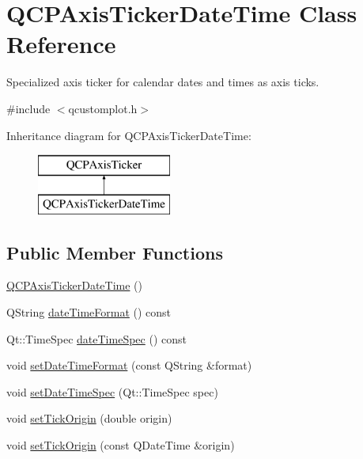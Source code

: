 \hypertarget{class_q_c_p_axis_ticker_date_time}{}\section{Q\+C\+P\+Axis\+Ticker\+Date\+Time Class Reference}
\label{class_q_c_p_axis_ticker_date_time}


Specialized axis ticker for calendar dates and times as axis ticks.  




{\ttfamily \#include $<$qcustomplot.\+h$>$}

Inheritance diagram for Q\+C\+P\+Axis\+Ticker\+Date\+Time\+:\begin{figure}[H]
\begin{center}
\leavevmode
\includegraphics[height=2.000000cm]{d0/da7/class_q_c_p_axis_ticker_date_time}
\end{center}
\end{figure}
\subsection*{Public Member Functions}
\begin{DoxyCompactItemize}
\item 
\mbox{\hyperlink{class_q_c_p_axis_ticker_date_time_a84cc5c6bbc7c99c1f9bd4b3a392e1b9d}{Q\+C\+P\+Axis\+Ticker\+Date\+Time}} ()
\item 
Q\+String \mbox{\hyperlink{class_q_c_p_axis_ticker_date_time_aac8e2bb32ca8ff1394c42d2d62390718}{date\+Time\+Format}} () const
\item 
Qt\+::\+Time\+Spec \mbox{\hyperlink{class_q_c_p_axis_ticker_date_time_ae688e69ba55c9247af26b6db85cf9573}{date\+Time\+Spec}} () const
\item 
void \mbox{\hyperlink{class_q_c_p_axis_ticker_date_time_ad52660a82f688395468674d555f6a86b}{set\+Date\+Time\+Format}} (const Q\+String \&format)
\item 
void \mbox{\hyperlink{class_q_c_p_axis_ticker_date_time_afbd987c7197e42ab61e67fb1c38abebc}{set\+Date\+Time\+Spec}} (Qt\+::\+Time\+Spec spec)
\item 
void \mbox{\hyperlink{class_q_c_p_axis_ticker_date_time_a5388e048cbd32cf1ba730b9f1859eb5c}{set\+Tick\+Origin}} (double origin)
\item 
void \mbox{\hyperlink{class_q_c_p_axis_ticker_date_time_a2ea905872b8171847a49a5e093fb0c48}{set\+Tick\+Origin}} (const Q\+Date\+Time \&origin)
\end{DoxyCompactItemize}
